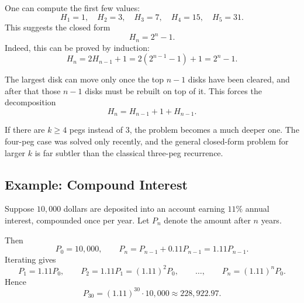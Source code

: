 \begin{center}
\end{center}

One can compute the first few values:
\[
H_1=1,\quad H_2=3,\quad H_3=7,\quad H_4=15,\quad H_5=31.
\]
This suggests the closed form
\[
H_n=2^n-1.
\]
Indeed, this can be proved by induction:
\[
H_n=2H_{n-1}+1=2(2^{n-1}-1)+1=2^n-1.
\]

\begin{examtip}[title={Why this recurrence is natural}]
The largest disk can move only once the top $n-1$ disks have been cleared, and after that those $n-1$ disks must be rebuilt on top of it. This forces the decomposition
\[
H_n=H_{n-1}+1+H_{n-1}.
\]
\end{examtip}

\begin{extension}[title={Reve's puzzle}]
If there are $k\ge 4$ pegs instead of $3$, the problem becomes a much deeper one. The four-peg case was solved only recently, and the general closed-form problem for larger $k$ is far subtler than the classical three-peg recurrence.
\end{extension}

\subsection{Example: Compound Interest}

\begin{examplebox}[title={Compound interest recurrence}]
Suppose $10{,}000$ dollars are deposited into an account earning $11\%$ annual interest, compounded once per year. Let $P_n$ denote the amount after $n$ years.

Then
\[
P_0=10{,}000,
\qquad
P_n=P_{n-1}+0.11P_{n-1}=1.11P_{n-1}.
\]
Iterating gives
\[
P_1=1.11P_0,
\qquad
P_2=1.11P_1=(1.11)^2P_0,
\qquad
\dots,
\qquad
P_n=(1.11)^nP_0.
\]
Hence
\[
P_{30}=(1.11)^{30}\cdot 10{,}000\approx 228{,}922.97.
\]
\end{examplebox}

